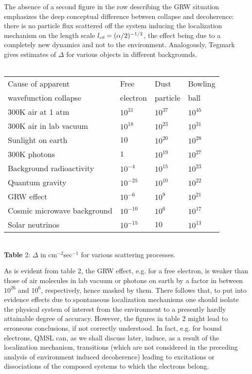 \documentclass[12pt]{article}
\begin{document}
The absence of a second figure in the row describing the GRW situation
emphasizes the deep conceptual difference between collapse and
decoherence: there is no particle flux scattered off  the system inducing
the localization mechanism on the length scale $l_{\makebox{\tiny
eff}} = (\alpha/2)^{-1/2}$, the effect being due to a completely
new dynamics and not to the environment. Analogously, Tegmark
gives estimates of $\Delta$ for various objects in different
backgrounds.
\\ \\ \begin{center}
\begin{tabular}{||l|lll||} \hline
Cause of apparent & Free & Dust & Bowling \\
wavefunction collapse & electron & particle & ball \\ \hline
300K air at 1 atm  & $10^{31}$ & $10^{37}$ & $10^{45}$ \\
300K air in lab vacuum  & $10^{18}$ & $10^{23}$ & $10^{31}$ \\
Sunlight on earth  & $10$ & $10^{20}$ & $10^{28}$ \\
300K photons  & $1$ & $10^{19}$ & $10^{27}$ \\
Background radioactivity  & $10^{-4}$ & $10^{15}$ & $10^{23}$ \\
Quantum gravity  & $10^{-25}$ & $10^{10}$ & $10^{22}$ \\
\hline
GRW effect  & $10^{-6}$ & $10^{9}$ & $10^{21}$ \\
\hline Cosmic microwave background  & $10^{-10}$ & $10^{6}$ &
$10^{17}$ \\
Solar neutrinos & $10^{-15}$ & $10$ & $10^{13}$ \\
\hline
\end{tabular}
\\ \vspace{.3cm}
{\small {\bf Table} 2: $\Delta$ in cm${}^{-2}$sec${}^{-1}$ for
various scattering processes.}
\end{center}

As is evident from table 2, the GRW effect, e.g. for a free
electron, is weaker than those of air molecules in lab vacuum or
photons on earth by a factor in between $10^{26}$ and $10^{6}$,
respectively, hence masked by them.
There follows that, to put into evidence effects due to spontaneous
localization mechanisms one should isolate the physical system of
interest from the environment to a presently hardly attainable
degree of accuracy.
However, the figures in table 2 might lead to erroneous
conclusions, if not correctly understood. In fact, e.g. for bound
electrons, QMSL can, as we shall discuss later, induce, as a
result of the localization mechanism, transitions (which are not
considered in the preceding analysis of environment induced
decoherence) leading to excitations or dissociations of the
composed systems to which the electrons belong.
\end{document}
